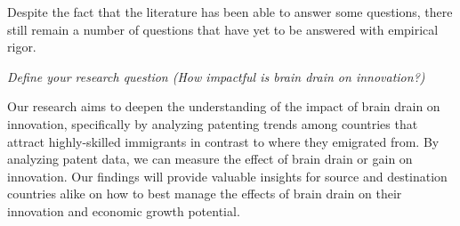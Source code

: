 \documentclass[12pt]{article}
\newcommand{\pointer}[1]{{\color{red} \center \textit{#1}}}
\begin{document}
Despite the fact that the literature has been able to answer some questions, there still remain a number of questions that have yet to be answered with empirical rigor.


\pointer{Define your research question (How impactful is brain drain on innovation?)}

Our research aims to deepen the understanding of the impact of brain drain on innovation, specifically by analyzing patenting trends among countries that attract highly-skilled immigrants in contrast to where they emigrated from.
By analyzing patent data, we can measure the effect of brain drain or gain on innovation.
Our findings will provide valuable insights for source and destination countries alike on how to best manage the effects of brain drain on their innovation and economic growth potential.

\end{document}
